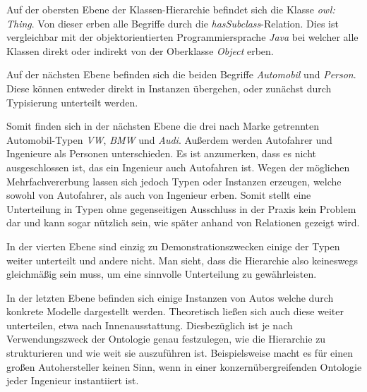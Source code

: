 \documentclass[12pt]{report}
\begin{document}
Auf der obersten Ebene der Klassen-Hierarchie befindet sich die Klasse \textit{owl: Thing}. Von dieser erben alle Begriffe durch die \textit{hasSubclass}-Relation. Dies ist vergleichbar mit der objektorientierten Programmiersprache \textit{Java} bei welcher alle Klassen direkt oder indirekt von der Oberklasse \textit{Object} erben. 

Auf der nächsten Ebene befinden sich die beiden Begriffe \textit{Automobil} und \textit{Person}. Diese können entweder direkt in Instanzen übergehen, oder zunächst durch Typisierung unterteilt werden. 

Somit finden sich in der nächsten Ebene die drei nach Marke getrennten Automobil-Typen \textit{VW}, \textit{BMW} und \textit{Audi}. Außerdem werden Autofahrer und Ingenieure als Personen unterschieden. Es ist anzumerken, dass es nicht ausgeschlossen ist, das ein Ingenieur auch Autofahren ist. Wegen der möglichen Mehrfachvererbung lassen sich jedoch Typen oder Instanzen erzeugen, welche sowohl von Autofahrer, als auch von Ingenieur erben. Somit stellt eine Unterteilung in Typen ohne gegenseitigen Ausschluss in der Praxis kein Problem dar und kann sogar nützlich sein, wie später anhand von Relationen gezeigt wird. 

In der vierten Ebene sind einzig zu Demonstrationszwecken einige der Typen weiter unterteilt und andere nicht. Man sieht, dass die Hierarchie also keineswegs gleichmäßig sein muss, um eine sinnvolle Unterteilung zu gewährleisten. 

In der letzten Ebene befinden sich einige Instanzen von Autos welche durch konkrete Modelle dargestellt werden. Theoretisch ließen sich auch diese weiter unterteilen, etwa nach Innenausstattung. Diesbezüglich ist je nach Verwendungszweck der Ontologie genau festzulegen, wie die Hierarchie zu strukturieren und wie weit sie auszuführen ist. Beispielsweise macht es für einen großen Autohersteller keinen Sinn, wenn in einer konzernübergreifenden Ontologie jeder Ingenieur instantiiert ist.
\end{document}
